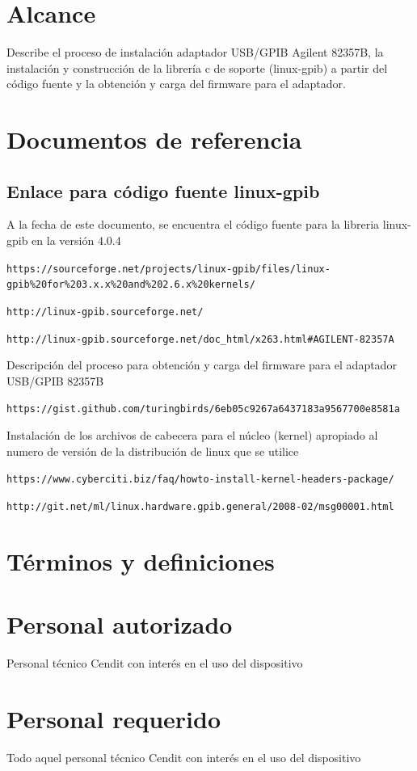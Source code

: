 \documentclass[paper=letter,oneside,fontsize=12pt]{article}
\begin{document}
	\section{Alcance}
		Describe el proceso de instalación adaptador USB/GPIB Agilent 82357B, la instalación y construcción de la librería c de soporte (linux-gpib) a partir del código fuente y la obtención y carga del firmware para el adaptador.
	
		
	\section{Documentos de referencia}
	\subsection{Enlace para código fuente linux-gpib}
	A la fecha de este documento, se encuentra el código fuente para la libreria linux-gpib en la versión 4.0.4 
	
	\texttt{https://sourceforge.net/projects/linux-gpib/files/linux-gpib\%20for\%203.x.x\%20and\%202.6.x\%20kernels/}
	
	\texttt{http://linux-gpib.sourceforge.net/}
	
	\texttt{http://linux-gpib.sourceforge.net/doc\_html/x263.html\#AGILENT-82357A}
	
	Descripción del proceso para obtención y carga del firmware para el adaptador USB/GPIB 82357B
	
	\texttt{https://gist.github.com/turingbirds/6eb05c9267a6437183a9567700e8581a}
	
	Instalación de los  archivos de cabecera para el núcleo (kernel) apropiado al numero de versión de la distribución de linux que se utilice
	
	\texttt{https://www.cyberciti.biz/faq/howto-install-kernel-headers-package/}
	
	\texttt{http://git.net/ml/linux.hardware.gpib.general/2008-02/msg00001.html}
	
	\section{Términos y definiciones}
	
	\section{Personal autorizado}
		Personal técnico Cendit con interés en el uso del dispositivo
		
	\section{Personal requerido}
		Todo aquel personal técnico Cendit con interés en el uso del dispositivo
		
\end{document}
